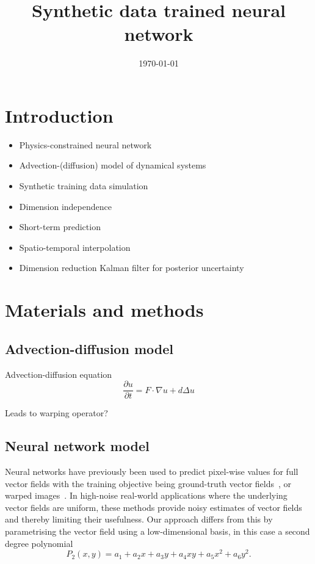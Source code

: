 \documentclass[a4paper,12pt]{article}
\title{Synthetic data trained neural network}
\author{}
\date{\today}
\begin{document}
\maketitle

\begin{abstract}
\end{abstract}

\section{Introduction}

\begin{itemize}
    \item
        Physics-constrained neural network
    \item
        Advection-(diffusion) model of dynamical systems
    \item
        Synthetic training data simulation
    \item
        Dimension independence
    \item
        Short-term prediction
    \item
        Spatio-temporal interpolation
    \item
        Dimension reduction Kalman filter for posterior uncertainty
\end{itemize}

\section{Materials and methods}
\subsection{Advection-diffusion model}
Advection-diffusion equation
\begin{equation}
    \frac{\partial u}{\partial t} = F \cdot \nabla u + d \Delta u
\end{equation}

Leads to warping operator?


\subsection{Neural network model}
Neural networks have previously been used to predict pixel-wise values for full vector fields with the training objective being ground-truth vector fields~\cite{ofnn}, or warped images~\cite{debezenac}.
In high-noise real-world applications where the underlying vector fields are uniform, these methods provide noisy estimates of vector fields and thereby limiting their usefulness.
Our approach differs from this by parametrising the vector field using a low-dimensional basis, in this case a second degree polynomial
\begin{equation}
    P_2(x,y) = a_1 + a_2x + a_3y + a_4xy + a_5x^2+a_6y^2.
\end{equation}
\end{document}
